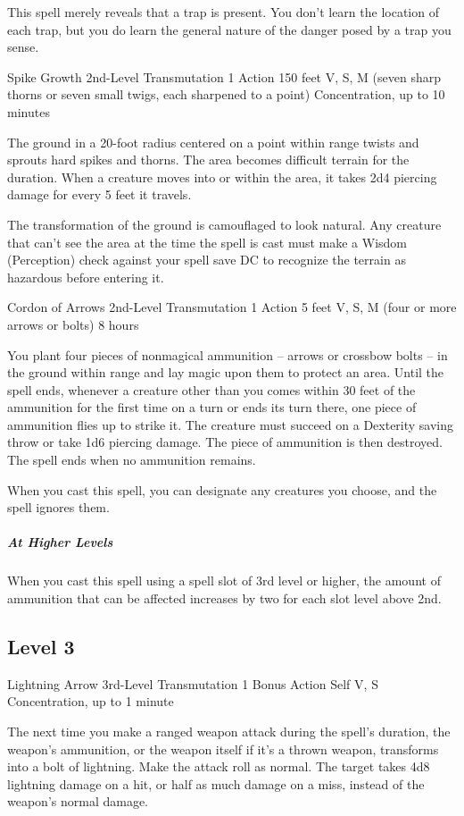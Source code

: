 \documentclass[letterpaper,openany,oneside,twocolumn]{book}
\begin{document}
This spell merely reveals that a trap is present. You don't learn the location of each trap, but you do learn the general nature of the danger posed by a trap you sense.

\DndSpellHeader
  {Spike Growth}
  {2nd-Level Transmutation}
  {1 Action}
  {150 feet}
  {V, S, M (seven sharp thorns or seven small twigs, each sharpened to a point)}
  {Concentration, up to 10 minutes}

The ground in a 20-foot radius centered on a point within range twists and sprouts hard spikes and thorns. The area becomes difficult terrain for the duration. When a creature moves into or within the area, it takes 2d4 piercing damage for every 5 feet it travels.

The transformation of the ground is camouflaged to look natural. Any creature that can't see the area at the time the spell is cast must make a Wisdom (Perception) check against your spell save DC to recognize the terrain as hazardous before entering it.

\DndSpellHeader
  {Cordon of Arrows}
  {2nd-Level Transmutation}
  {1 Action}
  {5 feet}
  {V, S, M (four or more arrows or bolts)}
  {8 hours}

You plant four pieces of nonmagical ammunition – arrows or crossbow bolts – in the ground within range and lay magic upon them to protect an area. Until the spell ends, whenever a creature other than you comes within 30 feet of the ammunition for the first time on a turn or ends its turn there, one piece of ammunition flies up to strike it. The creature must succeed on a Dexterity saving throw or take 1d6 piercing damage. The piece of ammunition is then destroyed. The spell ends when no ammunition remains.

When you cast this spell, you can designate any creatures you choose, and the spell ignores them.

\subparagraph{At Higher Levels} When you cast this spell using a spell slot of 3rd level or higher, the amount of ammunition that can be affected increases by two for each slot level above 2nd.

\subsection*{Level 3}

\DndSpellHeader
  {Lightning Arrow}
  {3rd-Level Transmutation}
  {1 Bonus Action}
  {Self}
  {V, S}
  {Concentration, up to 1 minute}

The next time you make a ranged weapon attack during the spell's duration, the weapon's ammunition, or the weapon itself if it's a thrown weapon, transforms into a bolt of lightning. Make the attack roll as normal. The target takes 4d8 lightning damage on a hit, or half as much damage on a miss, instead of the weapon's normal damage.
\end{document}
